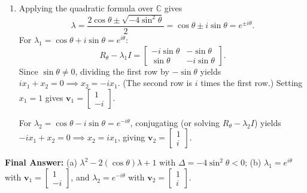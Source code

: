 \documentclass[11pt, letterpaper]{article}
\theoremstyle{definition}
\theoremstyle{remark}
\begin{document}
\begin{enumerate}[label=(\alph*)]
\begin{center}
    \end{center}

    \item Applying the quadratic formula over $\mathbb{C}$ gives
    \[
    \lambda = \frac{2\cos\theta \pm \sqrt{-4\sin^2\theta}}{2} = \cos\theta \pm i\sin\theta = e^{\pm i\theta}.
    \]
    For $\lambda_1 = \cos\theta + i\sin\theta = e^{i\theta}$:
    \[
    R_\theta - \lambda_1 I = \begin{bmatrix} -i\sin\theta & -\sin\theta \\ \sin\theta & -i\sin\theta \end{bmatrix}.
    \]
    Since $\sin\theta \neq 0$, dividing the first row by $-\sin\theta$ yields $i x_1 + x_2 = 0 \implies x_2 = -i x_1$. (The second row is $i$ times the first row.) Setting $x_1 = 1$ gives $\mathbf{v}_1 = \begin{bmatrix} 1 \\ -i \end{bmatrix}$.

    For $\lambda_2 = \cos\theta - i\sin\theta = e^{-i\theta}$, conjugating (or solving $R_\theta - \lambda_2 I$) yields $-i x_1 + x_2 = 0 \implies x_2 = i x_1$, giving $\mathbf{v}_2 = \begin{bmatrix} 1 \\ i \end{bmatrix}$.
\end{enumerate}
\textbf{Final Answer:} (a) $\lambda^2 - 2(\cos\theta)\lambda + 1$ with $\Delta = -4\sin^2\theta < 0$; (b) $\lambda_1 = e^{i\theta}$ with $\mathbf{v}_1 = \begin{bmatrix} 1 \\ -i \end{bmatrix}$, and $\lambda_2 = e^{-i\theta}$ with $\mathbf{v}_2 = \begin{bmatrix} 1 \\ i \end{bmatrix}$.
\end{document}
